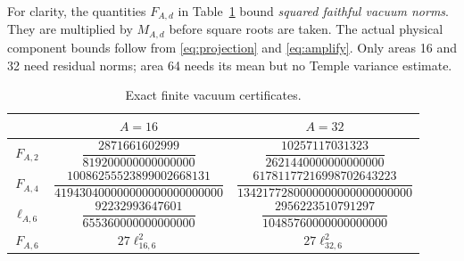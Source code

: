 For clarity, the quantities $F_{A,d}$ in Table~\ref{tab:vacuum} bound
\emph{squared faithful vacuum norms}. They are multiplied by $M_{A,d}$ before
square roots are taken. The actual physical component bounds follow from
\eqref{eq:projection} and \eqref{eq:amplify}. Only areas 16 and 32 need residual
norms; area 64 needs its mean but no Temple variance estimate.
\begin{table}[ht]
\centering\small
\begin{tabular}{c cc}\toprule
 & $A=16$ & $A=32$\\\midrule
$F_{A,2}$ & $\dfrac{2871661602999}{819200000000000000}$ & $\dfrac{10257117031323}{2621440000000000000}$\\[9pt]
$F_{A,4}$ & $\dfrac{10086255523899002668131}{419430400000000000000000000}$ & $\dfrac{61781177216998702643223}{1342177280000000000000000000}$\\[9pt]
$\ell_{A,6}$ & $\dfrac{92232993647601}{655360000000000000}$ & $\dfrac{2956223510791297}{10485760000000000000}$\\[9pt]
$F_{A,6}$ & $27\ell_{16,6}^2$ & $27\ell_{32,6}^2$\\\bottomrule
\end{tabular}
\caption{Exact finite vacuum certificates.}\label{tab:vacuum}
\end{table}


